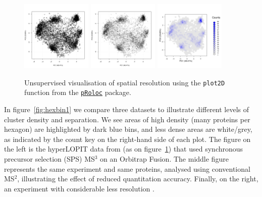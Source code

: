 \documentclass[12pt]{article}\usepackage[]{graphicx}\usepackage[]{color}
\newcommand{\Rpackage}[1]{\texttt{#1}}
\newcommand\Biocpkg[1]{%
  {\href{http://bioconductor.org/packages/#1}%
    {\Rpackage{#1}}}}
\begin{document}
\begin{figure}[ht]
  \centering
  \includegraphics[width = 0.3\textwidth]{./figure/density-1.pdf}
  \includegraphics[width = 0.3\textwidth]{./figure/density-2.pdf}
  \includegraphics[width = 0.3\textwidth]{./figure/density-3.pdf}
  \caption{Unsupervised visualisation of spatial resolution using the
    \texttt{plot2D} function from the \Biocpkg{pRoloc} package. }
  \label{fig:density}
\end{figure}



In figure~\ref{fig:hexbin1} we compare three datasets to illustrate
different levels of cluster density and separation. We see areas of
high density (many proteins per hexagon) are highlighted by dark blue
bins, and less dense areas are white/grey, as indicated by the count
key on the right-hand side of each plot. The figure on the left is the
hyperLOPIT data from \citet{Christoforou:2016} (as on
figure~\ref{fig:density}) that used synchronous precursor selection
(SPS) MS$^3$ on an Orbitrap Fusion. The middle figure represents the
same experiment and same proteins, analysed using conventional MS$^2$,
illustrating the effect of reduced quantitation accuracy. Finally, on
the right, an experiment with considerable less resolution
\citep{Hall:2009}.
\end{document}
